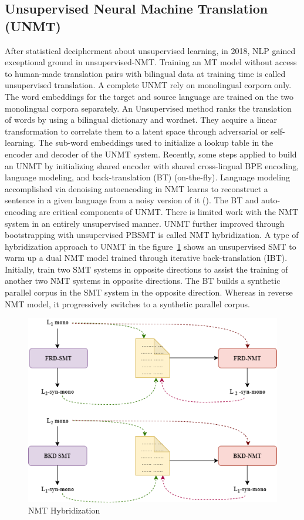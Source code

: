 \documentclass[manuscript,screen]{acmart}
\begin{document}
\subsection{Unsupervised Neural Machine Translation (UNMT)}
After statistical decipherment about unsupervised learning, in 2018, NLP gained exceptional ground in unsupervised-NMT. Training an MT model without access to human-made translation pairs with bilingual data at training time is called unsupervised translation. A complete UNMT rely on monolingual corpora only. The word embeddings for the target and source language are trained on the two monolingual corpora separately. An Unsupervised method ranks the translation of words by using a bilingual dictionary and wordnet. They acquire a linear transformation to correlate them to a latent space through adversarial or self-learning. The sub-word embeddings used to initialize a lookup table in the encoder and decoder of the UNMT system. Recently, some steps applied to build an UNMT by initializing shared encoder with shared cross-lingual BPE encoding, language modeling, and back-translation (BT) (on-the-fly). Language modeling accomplished via denoising autoencoding in NMT learns to reconstruct a sentence in a given language from a noisy version of it (\citet{xu2020spanish}). The BT and auto-encoding are critical components of UNMT. There is limited work with the NMT system in an entirely unsupervised manner. UNMT further improved through bootstrapping with unsupervised PBSMT is called NMT hybridization. A type of hybridization approach to UNMT in the figure~\ref{nmt-hybridization} shows an unsupervised SMT to warm up a dual NMT model trained through iterative back-translation (IBT). Initially, train two SMT systems in opposite directions to assist the training of another two NMT systems in opposite directions. The BT builds a synthetic parallel corpus in the SMT system in the opposite direction. Whereas in reverse NMT model, it progressively switches to a synthetic parallel corpus.

\begin{figure}[!h]
  \centering
  \includegraphics[width=0.5\linewidth]{NMTHybridization.png}
  \caption{NMT Hybridization}
  \label{nmt-hybridization}
\end{figure}
\end{document}
